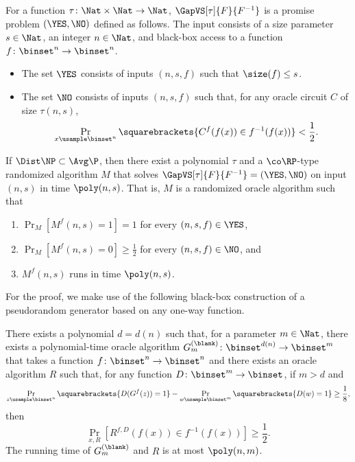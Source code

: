 \documentclass{toc}
\begin{document}
\begin{definition}
  For a function $\tau \colon \Nat \times \Nat \to \Nat$,
  $\GapVS[\tau]{F}{F^{-1}}$
  is a promise problem $(\YES, \NO)$ defined as follows.
  The input consists of a size parameter $s \in \Nat$, an integer $n \in \Nat$,
  and black-box access to a function $f \colon \binset^n \to \binset^n$.
  \begin{itemize}
    \item
          The set $\YES$ consists of inputs $(n, s, f)$
          such that $\size(f) \le s$.
    \item
          The set $\NO$ consists of
          inputs $(n, s, f)$
          such that, for any oracle circuit $C$ of size $\tau(n, s)$,
          $$
            \Pr_{x \usample \binset^n} \squarebrackets{ C^f(f(x)) \in f^{-1}(f(x)) } < \frac{1}{2}.
          $$
  \end{itemize}
\end{definition}

\begin{theorem}
  \label{thm_FvsFinv}
  If $\Dist\NP \subset \Avg\P$,
  then there exist
  a polynomial $\tau$ and
  a $\co\RP$-type randomized algorithm $M$ that solves $\GapVS[\tau]{F}{F^{-1}} = (\YES, \NO)$
  on input $(n, s)$
  in time $\poly(n, s)$.
  That is, $M$ is a randomized oracle algorithm such that
  \begin{enumerate}
    \item
          $\Pr_M [ M^f(n, s) = 1 ] = 1$ for every $(n, s, f) \in \YES$,
    \item
          $\Pr_M [ M^f(n, s) = 0 ] \ge \frac{1}{2}$ for every $(n, s, f) \in \NO$, and
    \item
          $M^f(n, s)$ runs in time $\poly(n, s)$.
  \end{enumerate}
\end{theorem}

For the proof, we make use of the following black-box construction
of a pseudorandom generator based on any one-way function.
\begin{lemma}
  \label{lemma_BBPRGfromOWF}
  There exists a polynomial $d = d(n)$
  such that,
  for a parameter $m \in \Nat$,
  there exists a polynomial-time oracle algorithm $G_{m}^{(\blank)} \colon \binset^{d(n)} \to \binset^{m}$
  that takes a function $f \colon \binset^n \to \binset^n$
  and there exists an oracle algorithm $R$
  such that, for any function $D \colon \binset^m \to \binset$, if $m > d$ and
  $$
    \Pr_{z \usample \binset^n} \squarebrackets{ D(G^f(z)) = 1 }
    -
    \Pr_{w \usample \binset^m} \squarebrackets{ D(w) = 1 }
    \ge
    \frac{1}{8},
  $$
  then
  $$
    \Pr_{x, R} [R^{f, D}(f(x)) \in f^{-1}(f(x))] \ge \frac{1}{2}.
  $$
  The running time of $G_{m}^{(\blank)}$ and $R$ is at most $\poly(n, m)$.
\end{lemma}
\end{document}
